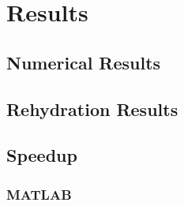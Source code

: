 \chapter{Results}

\section{Numerical Results}

\section{Rehydration Results}

\section{Speedup}

\subsection{MATLAB}

